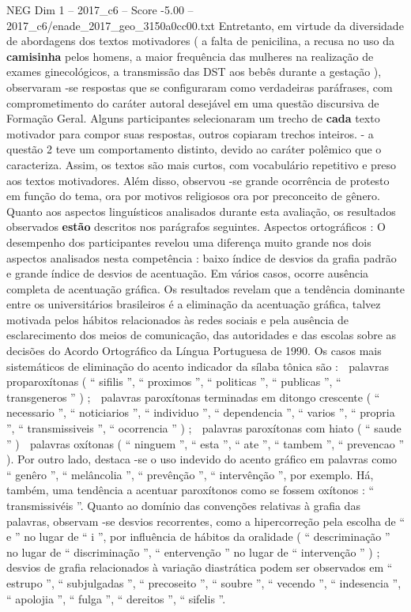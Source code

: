 \begin{textsample}{NEG Dim 1 – 2017\_c6 – Score -5.00 – 2017\_c6/enade\_2017\_geo\_3150a0cc00.txt}
Entretanto, em virtude da diversidade de abordagens dos textos motivadores ( a falta de penicilina, a recusa no uso da \textbf{camisinha} pelos homens, a maior frequência das mulheres na realização de exames ginecológicos, a transmissão das DST aos bebês durante a gestação ), observaram -se respostas que se configuraram como verdadeiras paráfrases, com comprometimento do caráter autoral desejável em uma questão discursiva de Formação Geral.
Alguns participantes selecionaram um trecho de \textbf{cada} texto motivador para compor suas respostas, outros copiaram trechos inteiros. - a questão 2 teve um comportamento distinto, devido ao caráter polêmico que o caracteriza.
Assim, os textos são mais curtos, com vocabulário repetitivo e preso aos textos motivadores.
Além disso, observou -se grande ocorrência de protesto em função do tema, ora por motivos religiosos ora por preconceito de gênero.
Quanto aos aspectos linguísticos analisados durante esta avaliação, os resultados observados \textbf{estão} descritos nos parágrafos seguintes.
Aspectos ortográficos : O desempenho dos participantes revelou uma diferença muito grande nos dois aspectos analisados nesta competência : baixo índice de desvios da grafia padrão e grande índice de desvios de acentuação.
Em vários casos, ocorre ausência completa de acentuação gráfica.
Os resultados revelam que a tendência dominante entre os universitários brasileiros é a eliminação da acentuação gráfica, talvez motivada pelos hábitos relacionados às redes sociais e pela ausência de esclarecimento dos meios de comunicação, das autoridades e das escolas sobre as decisões do Acordo Ortográfico da Língua Portuguesa de 1990.
Os casos mais sistemáticos de eliminação do acento indicador da sílaba tônica são :  palavras proparoxítonas ( “ sifilis ”, “ proximos ”, “ politicas ”, “ publicas ”, “ transgeneros ” ) ;  palavras paroxítonas terminadas em ditongo crescente ( “ necessario ”, “ noticiarios ”, “ individuo ”, “ dependencia ”, “ varios ”, “ propria ”, “ transmissiveis ”, “ ocorrencia ” ) ;  palavras paroxítonas com hiato ( “ saude ” )  palavras oxítonas ( “ ninguem ”, “ esta ”, “ ate ”, “ tambem ”, “ prevencao ” ).
Por outro lado, destaca -se o uso indevido do acento gráfico em palavras como “ genêro ”, “ melâncolia ”, “ prevênção ”, “ intervênção ”, por exemplo.
Há, também, uma tendência a acentuar paroxítonos como se fossem oxítonos : “ transmissivéis ”.
Quanto ao domínio das convenções relativas à grafia das palavras, observam -se desvios recorrentes, como a hipercorreção pela escolha de “ e ” no lugar de “ i ”, por influência de hábitos da oralidade ( “ descriminação ” no lugar de “ discriminação ”, “ entervenção ” no lugar de “ intervenção ” ) ; desvios de grafia relacionados à variação diastrática podem ser observados em “ estrupo ”, “ subjulgadas ”, “ precoseito ”, “ soubre ”, “ vecendo ”, “ indesencia ”, “ apolojia ”, “ fulga ”, “ dereitos ”, “ sifelis ”.

\end{textsample}
